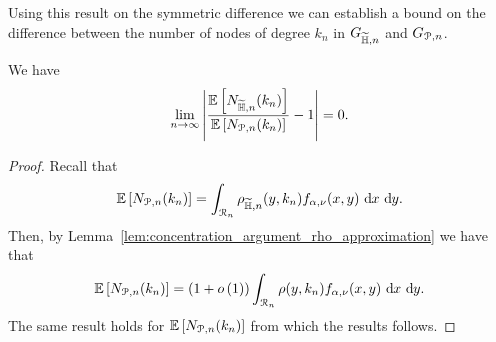 Using this result on the symmetric difference we can establish a bound on the difference between the number of nodes of degree $k_n$ in $G_{\widetilde{\mathbb{H}},n}$ and $G_{{\mathcal P},n}$.

\begin{lemma} \label{lem:difference_N_HP_P}
We have 
\[
	\lim_{n \to \infty} \left|\frac{\mathbb{E}\left[N_{\widetilde{\mathbb{H}},n}(k_n)\right]}{\mathbb{E}\left[N_{{\mathcal P},n}(k_n)\right]} - 1\right| = 0.
\]
\end{lemma}

\begin{proof} 
Recall that
\[
	\mathbb{E}\left[N_{{\mathcal P},n}(k_n)\right] = \int_{{\mathcal R}_n} \rho_{\widetilde{\mathbb{H}},n}(y,k_n) f_{\alpha,\nu}(x,y) \operatorname{\, \mathrm{d}\hspace{-2pt}} x \operatorname{\, \mathrm{d}\hspace{-2pt}} y.
\]
Then, by Lemma~\ref{lem:concentration_argument_rho_approximation} we have that
\[
	\mathbb{E}\left[N_{{\mathcal P},n}(k_n)\right] = (1+o\left(1\right)) \int_{{\mathcal R}_n} \rho(y,k_n) f_{\alpha,\nu}(x,y) \operatorname{\, \mathrm{d}\hspace{-2pt}} x \operatorname{\, \mathrm{d}\hspace{-2pt}} y.
\]
The same result holds for $\mathbb{E}\left[N_{{\mathcal P},n}(k_n)\right]$ from which the results follows.
\end{proof}

